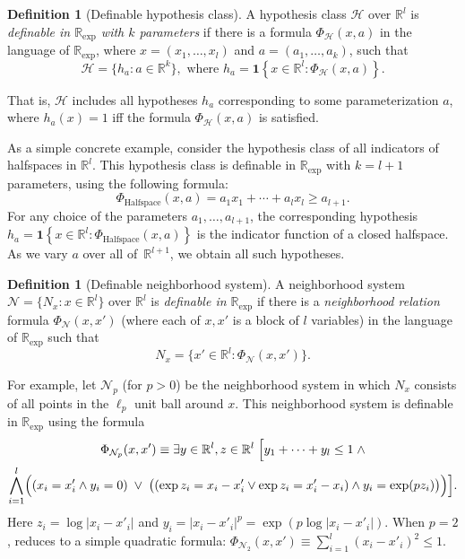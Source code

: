 \documentclass[11pt]{article}
\theoremstyle{plain}
\theoremstyle{definition}
\newtheorem{definition}[theorem]{Definition}
\theoremstyle{remark}
\newcommand{\R}{\mathbb{R}}
\begin{document}
\begin{definition}[Definable hypothesis class]
A hypothesis class $\mathcal{H}$ over $\mathbb R^l$ is \emph{definable in $\mathbb{R}_{\exp}$ with $k$ parameters} if there is a formula $\Phi_\mathcal{H}(x,a)$ in the language of $\mathbb{R}_{\exp}$,
where $x=(x_1,\dots,x_l)$ and $a=(a_1,\dots,a_k)$, such that
\[
\mathcal{H}
=
\{ h_a : a\in\mathbb R^k\}, \text{ where } 
h_a
=
\mathbf{1}{\!\left\{ x \in \R^l: \Phi_\mathcal{H}(x,a)\right\}}.
\]


\end{definition}
That is, $\mathcal{H}$ includes all hypotheses $h_a$ corresponding to some parameterization $a$,
where $h_a(x)=1$ iff the formula $\Phi_\mathcal{H}(x,a)$ is satisfied.

As a simple concrete example, consider the hypothesis class of all indicators of halfspaces in $\mathbb R^l$.
This hypothesis class is definable in $\mathbb{R}_{\exp}$ with $k = l + 1$ parameters, using the following formula:
\[
 \Phi_{\text{Halfspace}}(x,a) = a_1 x_1 + \cdots + a_l x_l \ge a_{l+1}.
\]
For any choice of the parameters $a_1,\dots,a_{l+1}$, 
the corresponding hypothesis
\(h_a=\mathbf 1{\!\left\{x\in\mathbb R^l : \Phi_{\text{Halfspace}}(x,a)\right\}}\)
is the indicator function of a closed halfspace. As we vary $a$ over all of~$\mathbb{R}^{l+1}$, we obtain all such hypotheses.
\begin{definition}[Definable neighborhood system]
A neighborhood system $\mathcal{N} = \{ N_x : x \in \mathbb R^l \}$ over $\mathbb R^l$ is \emph{definable in $\mathbb{R}_{\exp}$} if there is a \emph{neighborhood relation} formula $\Phi_\mathcal{N}(x,x')$ (where each of $x,x'$ is a block of $l$ variables) in the language of $\mathbb R_{\exp}$ such that
\[ N_x = \{ x' \in \mathbb R^l : \Phi_\mathcal{N}(x,x') \}. \]
\end{definition}

For example, let $\mathcal{N}_p$ (for $p>0$) be the neighborhood system in
which $N_x$ consists of all points in the $\ell_p$ unit ball around $x$.
This neighborhood system is definable in $\mathbb R_{\exp}$ using the formula
\begin{multline}
\label{eq:phi-np}
\Phi_{\mathcal{N}_p}(x,x')
\equiv
\exists y\in \mathbb{R}^l,z \in \mathbb{R}^l\;
\Bigl[
y_1+\cdots+y_l \le 1
\;\land \\
\bigwedge_{i=1}^l
\Bigl(
(x_i=x_i' \land y_i=0)
\;\lor\;
\bigl(
(\exp z_i=x_i-x_i' \lor \exp z_i=x_i'-x_i)
\land
y_i=\exp(pz_i)
\bigr)
\Bigr)
\Bigr].
\end{multline}
Here $z_i = \log |x_i - x'_i|$ and $y_i = |x_i-x'_i|^p = \exp(p \log |x_i-x'_i|)$.
When $p=2$,  reduces to a simple quadratic formula:
$\Phi_{\mathcal{N}_2}(x,x') \equiv \sum_{i=1}^l (x_i - x'_i)^2 \le 1$.
\end{document}

